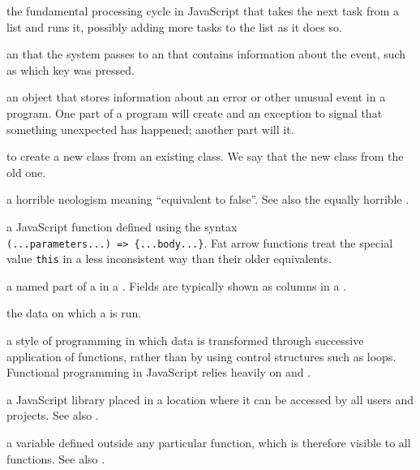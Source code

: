 \begin{description}
the fundamental processing cycle in JavaScript that takes the next task from a
list and runs it, possibly adding more tasks to the list as it does so.

an  that the system passes to an  that contains information about the event, such as
which key was pressed.

an object that stores information about an error or other unusual event in a
program. One part of a program will create and  an exception
to signal that something unexpected has happened; another part will
 it.

to create a new class from an existing class. We say that the new class
 from the old one.

a horrible neologism meaning ``equivalent to false''. See also the equally
horrible .

a JavaScript function defined using the syntax \texttt{(...parameters...)\ ={\textgreater}{}\ \{...body...\}}. Fat arrow functions treat the special value \texttt{this} in a less
inconsistent way than their older equivalents.

a named part of a  in a . Fields are typically shown as columns in a
.

the data on which a  is run.

a style of programming in which data is transformed through successive
application of functions, rather than by using control structures such as
loops. Functional programming in JavaScript relies heavily on
 and .

a JavaScript library placed in a location where it can be accessed by all
users and projects. See also .

a variable defined outside any particular function, which is therefore visible
to all functions. See also .


\end{description}
